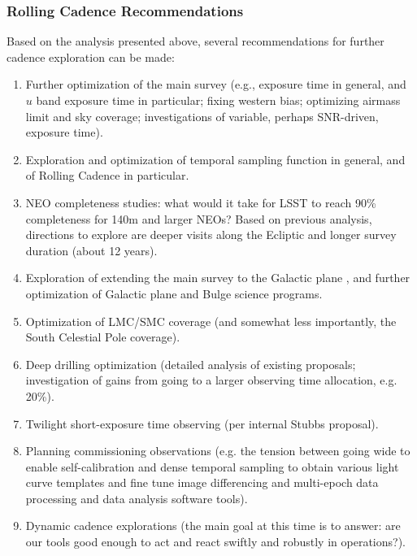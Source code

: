 \subsubsection{Rolling Cadence Recommendations}

Based on the analysis presented above, several recommendations
for further cadence exploration can be made:

\begin{enumerate}

\item Further optimization of the main survey (e.g., exposure time in
general, and $u$ band exposure time in particular; fixing western bias;
optimizing airmass limit and sky coverage; investigations of variable,
perhaps SNR-driven, exposure time).

\item Exploration and optimization of temporal sampling function in
general, and of Rolling Cadence in particular.

\item NEO completeness studies: what would it take for LSST to reach
90\% completeness for 140m and larger NEOs?  Based on previous
analysis, directions to explore are deeper visits along the Ecliptic
and longer survey duration (about 12 years).

\item Exploration of extending the main survey to the Galactic plane
\citep{Gould2013}, and further optimization of
Galactic plane and Bulge science programs.

\item Optimization of LMC/SMC coverage (and somewhat less importantly,
the South Celestial Pole coverage).

\item Deep drilling optimization (detailed analysis of existing
proposals; investigation of gains from going to a larger observing
time allocation, e.g. 20\%).

\item Twilight short-exposure time observing (per internal Stubbs proposal).

\item Planning commissioning observations (e.g. the tension between
going wide to enable self-calibration and dense temporal sampling to
obtain various light curve templates and fine tune image differencing
and multi-epoch data processing and data analysis software tools).

\item Dynamic cadence explorations (the main goal at this time is to
answer: are our tools good enough to act and react swiftly and
robustly in operations?).

\end{enumerate}



\navigationbar
